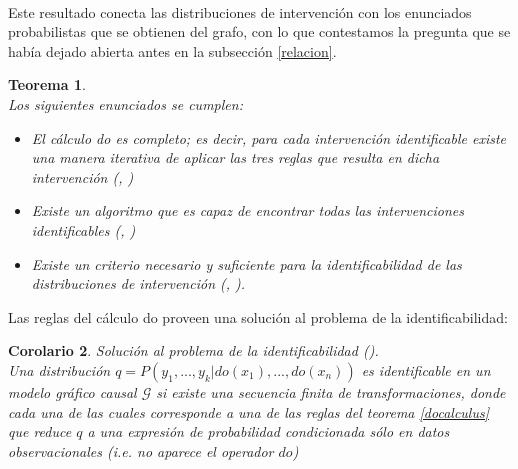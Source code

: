 \documentclass[11pt]{article}
\theoremstyle{plain}
\newtheorem{teo}{Teorema}
\newtheorem{cor}[teo]{Corolario}
\begin{document}
\\
\indent Este resultado conecta las distribuciones de intervención con los enunciados probabilistas que se obtienen del grafo, con lo que contestamos la pregunta que se había dejado abierta antes en la subsección \ref{relacion}.
\begin{teo}{\cite{peters2017elements}}\\
Los siguientes enunciados se cumplen:
\begin{itemize}
\item El cálculo do es completo; es decir, para cada intervención identificable existe una manera iterativa de aplicar las tres reglas que resulta en dicha intervención (\cite{huang2006pearl}, \cite{shpitser2006identification})
\item Existe un algoritmo que es capaz de encontrar todas las intervenciones identificables (\cite{tian2002}, \cite{huang2006pearl})
\item Existe un criterio necesario y suficiente para la identificabilidad de las distribuciones de intervención (\cite{shpitser2006identification}, \cite{huang2006pearl}).
\end{itemize}
\end{teo}
Las reglas del cálculo do proveen una solución al problema de la identificabilidad:
\begin{cor} Solución al problema de la identificabilidad (\cite{pearl2009causality}).\\
Una distribución $q=P(y_1,...,y_k | do(x_1),...,do(x_n))$ es identificable en un modelo gráfico causal $\mathcal{G}$ si existe una secuencia finita de transformaciones, donde cada una de las cuales corresponde a una de las reglas del teorema \ref{docalculus} que reduce $q$ a una expresión de probabilidad condicionada sólo en datos observacionales (i.e. no aparece el operador $do$)
\end{cor}
\end{document}
